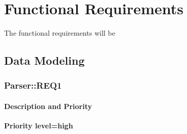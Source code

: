 \documentclass{scrreprt}
\begin{document}
\chapter{Functional Requirements}
The functional requirements will be





\section{Data Modeling}

\subsection{Parser::REQ1}

\subsubsection{Description and Priority}

\textbf{Priority level=high}\\
\end{document}
